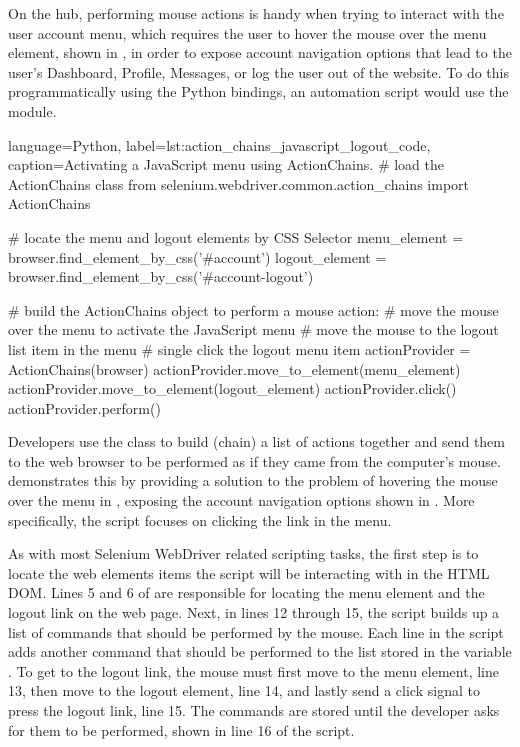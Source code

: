 On the hub, performing mouse actions is handy when trying to interact with the
user account menu, which requires the user to hover the mouse over the menu
element, shown in , in order to expose
account navigation options that lead to the user's Dashboard, Profile,
Messages, or log the user out of the website. To do this programmatically using
the Python bindings, an automation script would use the
 module.

\begin{xcode}{%
  language=Python,%
  label=lst:action_chains_javascript_logout_code,%
  caption={Activating a JavaScript menu using ActionChains.}%
}
# load the ActionChains class
from selenium.webdriver.common.action_chains import ActionChains

# locate the menu and logout elements by CSS Selector
menu_element = browser.find_element_by_css('#account')
logout_element = browser.find_element_by_css('#account-logout')

# build the ActionChains object to perform a mouse action:
# move the mouse over the menu to activate the JavaScript menu
# move the mouse to the logout list item in the menu
# single click the logout menu item
actionProvider = ActionChains(browser)
actionProvider.move_to_element(menu_element)
actionProvider.move_to_element(logout_element)
actionProvider.click()
actionProvider.perform()
\end{xcode}

Developers use the  class to build (chain) a list of
actions together and send them to the web browser to be performed as if they
came from the computer's mouse.
 demonstrates this by providing
a solution to the problem of hovering the mouse over the menu in
, exposing the account navigation options
shown in . More specifically, the script
focuses on clicking the  link in the menu.

As with most Selenium WebDriver related scripting tasks, the first step is to
locate the web elements items the script will be interacting with in the HTML
DOM. Lines 5 and 6 of 
are responsible for locating the menu element and the logout link on the web
page. Next, in lines 12 through 15, the script builds up a list of commands that
should be performed by the mouse. Each line in the script adds another command
that should be performed to the list stored in the variable
. To get to the logout link, the mouse must first move
to the menu element, line 13, then move to the logout element, line 14, and
lastly send a click signal to press the logout link, line 15. The commands are
stored until the developer asks for them to be performed, shown in line 16 of
the script.


